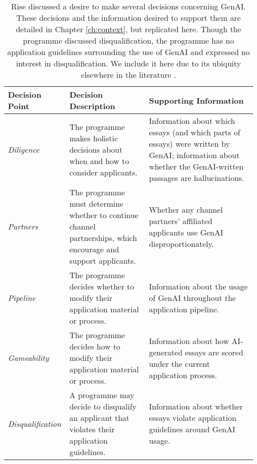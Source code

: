 \begin{table}[htbp]
  \centering
  \caption{Rise discussed a desire to make several decisions concerning GenAI. These decisions and the information desired to support them are detailed in Chapter \ref{ch:context}, but replicated here. Though the programme discussed disqualification, the programme has no application guidelines surrounding the use of GenAI and expressed no interest in disqualification. We include it here due to its ubiquity elsewhere in the literature \cite{liang_gpt_2023,mitchell_detectgpt_2023,tharindu_kumarage_stylometric_2023,kalpesh_krishna_paraphrasing_2023}.}
  \label{tab:decisions}
  \begin{tabular}{ p{}p{}p{}}
      \toprule
      Decision Point & Decision Description & Supporting Information \\
      \midrule
      \emph{Diligence} & The programme makes holistic decisions about when and how to consider applicants. & Information about which essays (and which parts of essays) were written by GenAI; information about whether the GenAI-written passages are hallucinations. \\ 
      \emph{Partners} & The programme must determine whether to continue channel partnerships, which encourage and support applicants. & Whether any channel partners' affiliated applicants use GenAI disproportionately. \\
      \emph{Pipeline} & The programme decides whether to modify their application material or process. & Information about the usage of GenAI throughout the application pipeline. \\
      \emph{Gameability} & The programme decides how to modify their application material or process. & Information about how AI-generated essays are scored under the current application process. \\
      \midrule
      \emph{Disqualification} & A programme may decide to disqualify an applicant that violates their application guidelines. & Information about whether essays violate application guidelines around GenAI usage. \\
      \bottomrule
  \end{tabular}
\end{table}


